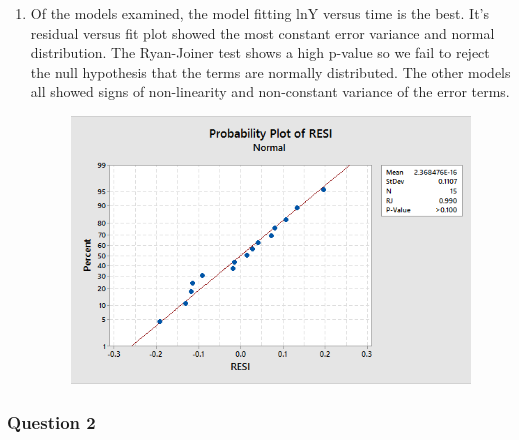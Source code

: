 \documentclass{article}
\providecommand{\tightlist}{%
      \setlength{\itemsep}{0pt}\setlength{\parskip}{0pt}}
\begin{document}
\begin{enumerate}
\def\labelenumi{\alph{enumi})}
\setcounter{enumi}{5}
\tightlist
\item
  Of the models examined, the model fitting lnY versus time is the best.
  It's residual versus fit plot showed the most constant error variance
  and normal distribution. The Ryan-Joiner test shows a high p-value so
  we fail to reject the null hypothesis that the terms are normally
  distributed. The other models all showed signs of non-linearity and
  non-constant variance of the error terms.
  
  \begin{figure}[h!]
 \centering
 \includegraphics[scale=.4]{./images/probPlot_residual_lnY-vs-time.png}
\end{figure}
\end{enumerate}

\newpage

    \subsubsection{Question 2}\label{question-2}
\end{document}
